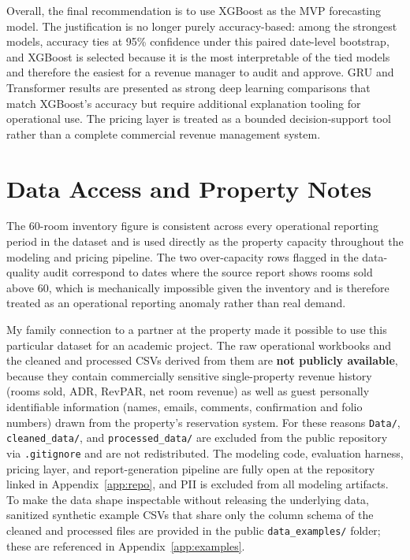 \documentclass[conference]{IEEEtran}
\begin{document}
Overall, the final recommendation is to use XGBoost as the MVP forecasting model. The justification is no longer purely accuracy-based: among the strongest models, accuracy ties at 95\% confidence under this paired date-level bootstrap, and XGBoost is selected because it is the most interpretable of the tied models and therefore the easiest for a revenue manager to audit and approve. GRU and Transformer results are presented as strong deep learning comparisons that match XGBoost's accuracy but require additional explanation tooling for operational use. The pricing layer is treated as a bounded decision-support tool rather than a complete commercial revenue management system.

\appendices

\section{Data Access and Property Notes}
\label{app:property}
The 60-room inventory figure is consistent across every operational reporting period in the dataset and is used directly as the property capacity throughout the modeling and pricing pipeline. The two over-capacity rows flagged in the data-quality audit correspond to dates where the source report shows rooms sold above 60, which is mechanically impossible given the inventory and is therefore treated as an operational reporting anomaly rather than real demand.

My family connection to a partner at the property made it possible to use this particular dataset for an academic project. The raw operational workbooks and the cleaned and processed CSVs derived from them are \textbf{not publicly available}, because they contain commercially sensitive single-property revenue history (rooms sold, ADR, RevPAR, net room revenue) as well as guest personally identifiable information (names, emails, comments, confirmation and folio numbers) drawn from the property's reservation system. For these reasons \texttt{Data/}, \texttt{cleaned\_data/}, and \texttt{processed\_data/} are excluded from the public repository via \texttt{.gitignore} and are not redistributed. The modeling code, evaluation harness, pricing layer, and report-generation pipeline are fully open at the repository linked in Appendix~\ref{app:repo}, and PII is excluded from all modeling artifacts. To make the data shape inspectable without releasing the underlying data, sanitized synthetic example CSVs that share only the column schema of the cleaned and processed files are provided in the public \texttt{data\_examples/} folder; these are referenced in Appendix~\ref{app:examples}.
\end{document}
